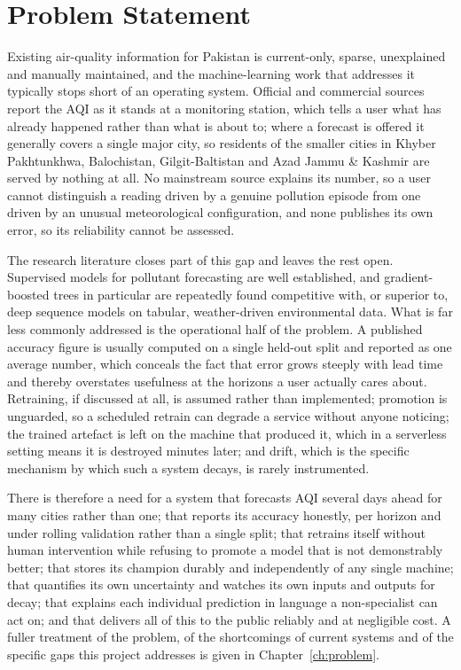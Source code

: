 \section{Problem Statement}
Existing air-quality information for Pakistan is current-only, sparse,
unexplained and manually maintained, and the machine-learning work that addresses
it typically stops short of an operating system. Official and commercial sources
report the AQI as it stands at a monitoring station, which tells a user what has
already happened rather than what is about to; where a forecast is offered it
generally covers a single major city, so residents of the smaller cities in
Khyber Pakhtunkhwa, Balochistan, Gilgit-Baltistan and Azad Jammu \& Kashmir are
served by nothing at all. No mainstream source explains its number, so a user
cannot distinguish a reading driven by a genuine pollution episode from one
driven by an unusual meteorological configuration, and none publishes its own
error, so its reliability cannot be assessed.

The research literature closes part of this gap and leaves the rest open.
Supervised models for pollutant forecasting are well established, and
gradient-boosted trees in particular are repeatedly found competitive with, or
superior to, deep sequence models on tabular, weather-driven environmental data.
What is far less commonly addressed is the operational half of the problem. A
published accuracy figure is usually computed on a single held-out split and
reported as one average number, which conceals the fact that error grows steeply
with lead time and thereby overstates usefulness at the horizons a user actually
cares about. Retraining, if discussed at all, is assumed rather than implemented;
promotion is unguarded, so a scheduled retrain can degrade a service without
anyone noticing; the trained artefact is left on the machine that produced it,
which in a serverless setting means it is destroyed minutes later; and drift,
which is the specific mechanism by which such a system decays, is rarely
instrumented.

There is therefore a need for a system that forecasts AQI several days ahead for
many cities rather than one; that reports its accuracy honestly, per horizon and
under rolling validation rather than a single split; that retrains itself without
human intervention while refusing to promote a model that is not demonstrably
better; that stores its champion durably and independently of any single machine;
that quantifies its own uncertainty and watches its own inputs and outputs for
decay; that explains each individual prediction in language a non-specialist can
act on; and that delivers all of this to the public reliably and at negligible
cost. A fuller treatment of the problem, of the shortcomings of current systems
and of the specific gaps this project addresses is given in
Chapter~\ref{ch:problem}.

